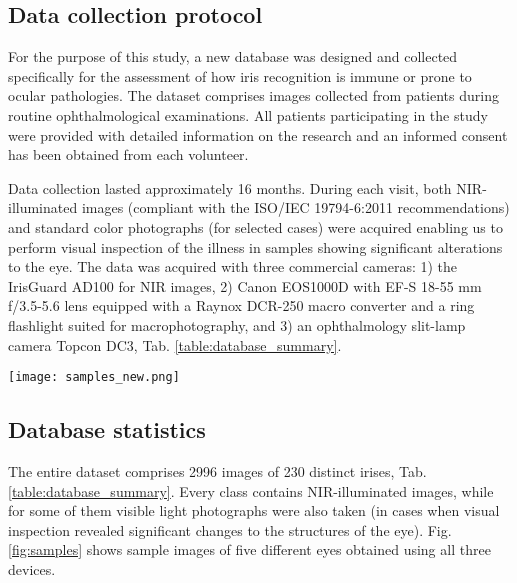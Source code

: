 \documentclass[article,12pt]{elsarticle}
\begin{document}
\subsection{Data collection protocol}

For the purpose of this study, a new database was designed and collected specifically for the assessment of how iris recognition is immune or prone to ocular pathologies. The dataset comprises images collected from patients during routine ophthalmological examinations. All patients participating in the study were provided with detailed information on the research and an informed consent has been obtained from each volunteer.

Data collection lasted approximately 16 months. During each visit, both NIR-illuminated images (compliant with the ISO/IEC 19794-6:2011 recommendations) and standard color photographs (for selected cases) were acquired enabling us to perform visual inspection of the illness in samples showing significant alterations to the eye. The data was acquired with three commercial cameras: 1) the IrisGuard AD100 for NIR images, 2) Canon EOS1000D with EF-S 18-55 mm f/3.5-5.6 lens equipped with a Raynox DCR-250 macro converter and a ring flashlight suited for macrophotography, and 3) an ophthalmology slit-lamp camera Topcon DC3, Tab. \ref{table:database_summary}.

\begin{figure*}[!t]
\centering
\texttt{[image: samples\_new.png]}
\caption{Samples of 5 different eyes acquired using three different imaging systems: IrisGuard AD-100 (top row), Canon EOS 1000D (middle row), and Topcon DC3 slit-lamp camera (bottom row). Each column includes samples corresponding to a different group used further in our experimental study, namely: healthy eye (H1-H3), unhealthy eye but with a clearly visible iris pattern (C1-C3), eye with geometrical deviations (G1-G3), eye with iris tissue impairments (T1-T3), and eye with obstructions in front of the iris (O1-O3).}
\label{fig:samples}
\end{figure*}


\subsection{Database statistics} 

The entire dataset comprises 2996 images of 230 distinct irises, Tab. \ref{table:database_summary}. Every class contains NIR-illuminated images, while for some of them visible light photographs were also taken (in cases when visual inspection revealed significant changes to the structures of the eye). Fig. \ref{fig:samples} shows sample images of five different eyes obtained using all three devices. 
\end{document}
